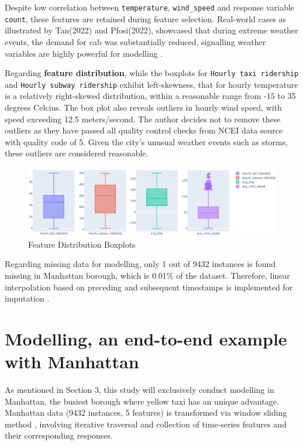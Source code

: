 \documentclass[11pt]{article}
\begin{document}
Despite low correlation between \texttt{temperature}, \texttt{wind\_speed} and response variable \texttt{count}, these features are retained during feature selection. Real-world cases as illustrated by Tan(2022) and Pfosi(2022), showcased that during extreme weather events, the demand for cab was substantially reduced, signalling weather variables are highly powerful for modelling \cite{Ming, NickPfosi}.

Regarding \textbf{feature distribution}, while the boxplots for \texttt{Hourly taxi ridership} and \texttt{Hourly subway ridership} exhibit left-skewness, that for hourly temperature is a relatively right-skewed distribution, within a reasonable range from -15 to 35 degrees Celcius. The box plot also reveals outliers in hourly wind speed, with speed exceeding 12.5 meters/second. The author decides not to remove these outliers as they have passed all quality control checks from NCEI data source with quality code of 5. Given the city's unusual weather events such as storms, these outliers are considered reasonable.  

\begin{figure}[ht]
    \centering
    \includegraphics[width=1.0\textwidth]{plots/boxplot2.jpg}
    \caption{Feature Distribution Boxplots}
    \label{fig:feature distribution}
\end{figure}
Regarding missing data for modelling, only 1 out of 9432 instances is found missing in Manhattan borough, which is 0.01\% of the dataset. Therefore, linear interpolation based on preceding and subsequent timestamps is implemented for imputation \cite{Pandas-Interpolate}. 

\section{Modelling, an end-to-end example with Manhattan}
As mentioned in Section 3, this study will exclusively conduct modelling in Manhattan, the busiest borough where yellow taxi has an unique advantage. Manhattan data (9432 instances, 5 features) is transformed via window sliding method \cite{Tran-NBeats}, involving iterative traversal and collection of time-series features and their corresponding responses.
\end{document}
